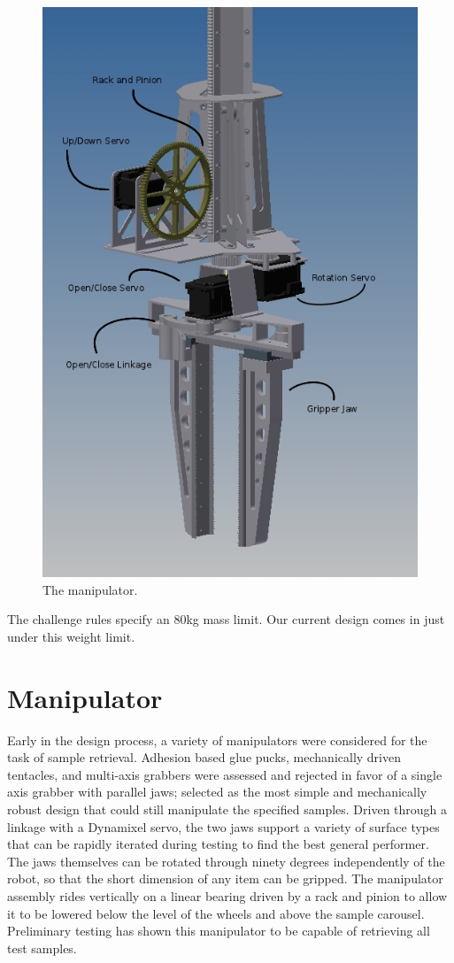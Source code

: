 \documentclass[12pt]{article}
\begin{document}
\begin{figure}[htbp]
\centering
\includegraphics[width=4.5in]{../assets/manipulator.jpg}
\caption{The manipulator.}
\label{fig_bot_manipulator}
\end{figure}

The challenge rules specify an 80kg mass limit. Our current design comes in just under this weight limit.

%
\section{Manipulator}\label{Manipulator}

Early in the design process, a variety of manipulators were considered for the task of sample retrieval. Adhesion based glue pucks, mechanically driven tentacles, and multi-axis grabbers were assessed and rejected in favor of a single axis grabber with parallel jaws; selected as the most simple and mechanically robust design that could still manipulate the specified samples. Driven through a linkage with a Dynamixel servo, the two jaws support a variety of surface types that can be rapidly iterated during testing to find the best general performer. The jaws themselves can be rotated through ninety degrees independently of the robot, so that the short dimension of any item can be gripped. The manipulator assembly rides vertically on a linear bearing driven by a rack and pinion to allow it to be lowered below the level of the wheels and above the sample carousel. Preliminary testing has shown this manipulator to be capable of retrieving all test samples.
\end{document}
